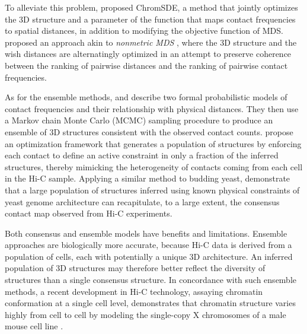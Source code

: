To alleviate this problem, \citet{zhang:inference} proposed ChromSDE,
a method that jointly optimizes the 3D structure and a parameter of
the function that maps contact frequencies to spatial distances, in
addition to modifying the objective function of MDS. \citet{ben-elazar:spatial}
proposed an approach akin to \emph{nonmetric MDS}
\citep{kruskal:multidimensional}, where the 3D structure and the wish
distances are alternatingly optimized in an attempt to preserve coherence
between the ranking of pairwise distances and the ranking of pairwise
contact frequencies.

As for the ensemble methods, \citet{rousseau:three} and
\citet{hu:bayesian} describe two formal probabilistic models of contact
frequencies and their relationship with physical distances. They then
use a Markov chain Monte Carlo (MCMC) sampling procedure to produce an
ensemble of 3D structures consistent with the observed contact counts.
\citet{kalhor:genome} propose an optimization framework that generates
a population of structures by enforcing each contact to define an active
constraint in only a fraction of the inferred structures, thereby mimicking the
heterogeneity of contacts coming from each cell in the Hi-C sample.
Applying a similar method to budding yeast, \citet{tjong:physical}
demonstrate that a large population of structures inferred using known
physical constraints of yeast genome architecture can recapitulate, to a
large extent, the consensus contact map observed from Hi-C experiments.

Both consensus and ensemble models have benefits and
limitations. Ensemble approaches are biologically more accurate,
because Hi-C data is derived from a population of cells, each with
potentially a unique 3D architecture. An inferred population of 3D
structures may therefore better reflect the diversity of structures
than a single consensus structure.  In concordance with such ensemble
methods, a recent development in Hi-C
technology, assaying chromatin conformation at a single cell level,
demonstrates that chromatin structure varies highly from cell to cell
by modeling the single-copy X chromosomes of a male mouse cell line
\citep{nagano:single-cell}.

